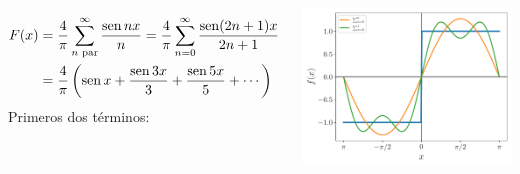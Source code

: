 \documentclass[9pt, aspectratio=169]{beamer}
\begin{document}
\begin{frame}
\begin{columns}[t]
\cx
\begin{align*}
F(x) &= \frac{4}{\pi} \sum_{n \text{ par}}^{\infty} \frac{\operatorname{sen} nx}{n} =  \frac{4}{\pi} \sum_{n = 0}^{\infty} \frac{\operatorname{sen} (2 n + 1) x}{2 n + 1}\\
     &= \frac{4}{\pi} \left( \operatorname{sen} x + \frac{\operatorname{sen} 3x}{3} + \frac{\operatorname{sen} 5 x}{5} + \cdots \right)
\end{align*}
Primeros dos términos:
\begin{center}
    \includegraphics[scale=0.45]{figs/step-01.pdf}
\end{center} \pause


\end{columns}
\end{frame}
\end{document}
